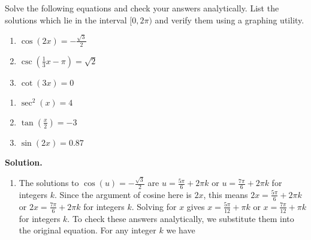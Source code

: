 \begin{ex}  \label{TrigEqnEx1} Solve the following equations and check your answers analytically.  List the solutions which lie in the interval $[0,2\pi)$ and verify them using a graphing utility.


\begin{multicols}{3}

\begin{enumerate}

\item  $\cos(2x) = -\frac{\sqrt{3}}{2}$
\item  $\csc\left(\frac{1}{3}x-\pi \right) = \sqrt{2}$
\item  $\cot\left(3x \right) = 0$

\setcounter{HW}{\value{enumi}}

\end{enumerate}

\end{multicols}

\begin{multicols}{3} 

\begin{enumerate}

\setcounter{enumi}{\value{HW}}

\item  $\sec^{2}(x) = 4$
\item  \label{arctanin02pi} $\tan\left(\frac{x}{2}\right) = -3$
\item  $\sin(2x) = 0.87$

\end{enumerate}

\end{multicols}

{\bf Solution.}

\begin{enumerate}

\item  The solutions to $\cos(u) =-\frac{\sqrt{3}}{2}$ are $u = \frac{5\pi}{6} + 2\pi k$ or $u = \frac{7\pi}{6} + 2\pi k$ for integers $k$.  Since the argument of cosine here is $2x$, this means $2x = \frac{5\pi}{6} + 2\pi k$ or $2x = \frac{7\pi}{6} + 2\pi k$ for integers $k$.  Solving for $x$ gives $x = \frac{5\pi}{12} + \pi k$ or $x = \frac{7\pi}{12} + \pi k$ for integers $k$.  To check these answers analytically, we substitute them into the original equation.  For any integer $k$ we have

\[ \begin{array}{rclr}


\end{array}\]
\end{enumerate}
\end{ex}
